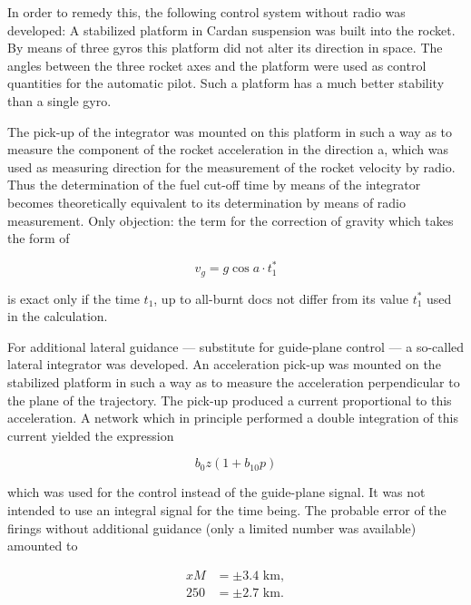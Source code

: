 \documentclass[12pt, a4paper]{article}
\begin{document}
In order to remedy this, the following control system without radio was developed: A stabilized platform in Cardan suspension was built into the rocket. By means of three gyros this platform did not alter its direction in space. The angles between the three rocket axes and the platform were used as control quantities for the automatic pilot. Such a platform has a much better stability than a single gyro.

The pick-up of the integrator was mounted on this platform in such a way as to measure the component of the rocket acceleration in the direction a, which was used as measuring direction for the measurement of the rocket velocity by radio. Thus the determination of the fuel cut-off time by means of the integrator becomes theoretically equivalent to its determination by means of radio measurement. Only objection: the term for the correction of gravity which takes the form of

\begin{equation}
  v_{g}=g\cos{a}\cdot{t_{1}^{*}}
\end{equation}

is exact only if the time $t_{1}$, up to all-burnt docs not differ from its value $t_{1}^{*}$ used
in the calculation.

For additional lateral guidance — substitute for guide-plane control — a so-called lateral integrator was developed. An acceleration pick-up was mounted on the stabilized platform in such a way as to measure the acceleration perpendicular to the plane of the trajectory. The pick-up produced a current proportional to this acceleration. A network which in principle performed a double integration of this current yielded the expression

\begin{equation}
  b_{0}z(1+b_{10}p)
\end{equation}

which was used for the control instead of the guide-plane signal. It was not intended to use an integral signal for the time being. The probable error of the firings without additional guidance (only a limited number was available) amounted to

\begin{equation*}
  \begin{split}
    x M&=\pm3.4\text{ km},\\
    250&=\pm2.7\text{ km}.
  \end{split}
\end{equation*}
\end{document}
